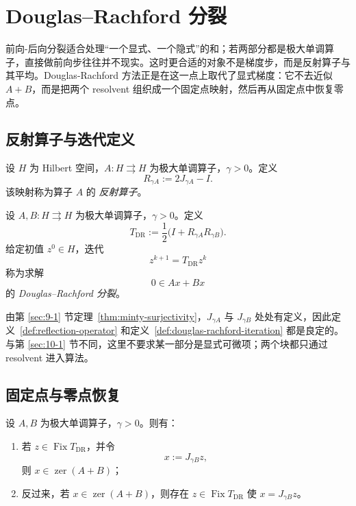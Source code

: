 \section{Douglas--Rachford 分裂}

\label{sec:10-2}

前向-后向分裂适合处理“一个显式、一个隐式”的和；若两部分都是极大单调算子，直接做前向步往往并不现实。这时更合适的对象不是梯度步，而是反射算子与其平均。Douglas-Rachford 方法正是在这一点上取代了显式梯度：它不去近似 $A+B$，而是把两个 resolvent 组织成一个固定点映射，然后再从固定点中恢复零点。

\subsection{反射算子与迭代定义}

\begin{definition}[反射算子]\label{def:reflection-operator}
设 $H$ 为 Hilbert 空间，$A\colon H\rightrightarrows H$ 为极大单调算子，$\gamma>0$。定义
\[
R_{\gamma A}:=2J_{\gamma A}-I.
\]
该映射称为算子 $A$ 的 \emph{反射算子}。
\end{definition}

\begin{definition}\label{def:douglas-rachford-iteration}
设 $A,B\colon H\rightrightarrows H$ 为极大单调算子，$\gamma>0$。定义
\[
T_{\mathrm{DR}}
:=
\frac12\bigl(I+R_{\gamma A}R_{\gamma B}\bigr).
\]
给定初值 $z^0\in H$，迭代
\[
z^{k+1}=T_{\mathrm{DR}}z^k
\]
称为求解
\[
0\in Ax+Bx
\]
的 \emph{Douglas--Rachford 分裂}。
\end{definition}

\begin{remark}
由第 \ref{sec:9-1} 节定理~\ref{thm:minty-surjectivity}，$J_{\gamma A}$ 与 $J_{\gamma B}$ 处处有定义，因此定义~\ref{def:reflection-operator} 和定义~\ref{def:douglas-rachford-iteration} 都是良定的。与第 \ref{sec:10-1} 节不同，这里不要求某一部分是显式可微项；两个块都只通过 resolvent 进入算法。
\end{remark}

\subsection{固定点与零点恢复}

\begin{proposition}\label{prop:dr-fixed-point-zer-sum}
设 $A,B$ 为极大单调算子，$\gamma>0$。则有：
\begin{enumerate}
  \item 若 $z\in \operatorname{Fix}T_{\mathrm{DR}}$，并令
  \[
  x:=J_{\gamma B}z,
  \]
  则 $x\in \operatorname{zer}(A+B)$；
  \item 反过来，若 $x\in \operatorname{zer}(A+B)$，则存在 $z\in \operatorname{Fix}T_{\mathrm{DR}}$ 使 $x=J_{\gamma B}z$。
\end{enumerate}
\end{proposition}


